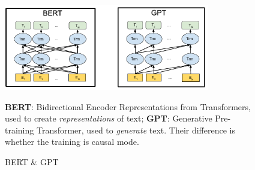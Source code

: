 \begin{figure}[htpb]
    \centering
    \includegraphics[width=0.8\textwidth]{figs/bertgpt.pdf}
    \caption{BERT \& GPT}
    {\footnotesize
    \textbf{BERT}: Bidirectional Encoder Representations from Transformers, used to create \textit{representations} of text;
    \textbf{GPT}: Generative Pre-training Transformer, used to \textit{generate} text.
    Their difference is whether the training is causal mode.
    }
    \label{fig:bertgpt}
\end{figure}